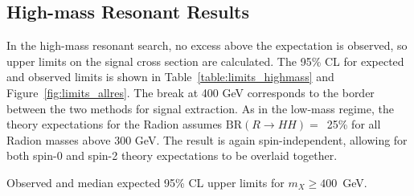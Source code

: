 \subsection{High-mass Resonant Results}

In the high-mass resonant search,
no excess above the expectation is observed, so upper limits on the signal cross section are calculated.
The 95\% CL for expected and observed limits is
shown in Table~\ref{table:limits_highmass} and Figure~\ref{fig:limits_allres}.
The break at 400 GeV corresponds
to the border between the two methods for signal extraction.
As in the low-mass regime, the theory expectations for the Radion assumes
$\text{BR}(R\rightarrow HH) =$~25\% for all Radion masses above 300 GeV. The result is again
spin-independent, allowing for both spin-0 and spin-2 theory expectations to be overlaid together.

\begin{table}[htbp!]
  \centering
  \renewcommand{\arraystretch}{1.4}
  \caption{Observed and median expected 95\% CL upper limits for $m_X \ge 400$~GeV.}
  
  \label{table:limits_highmass}
\end{table}

